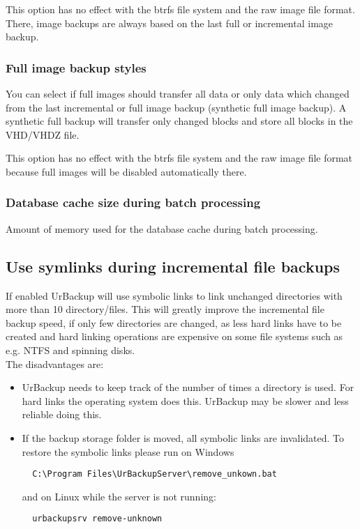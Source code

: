 \documentclass[a4paper,10pt]{article}
\begin{document}
\par\null\par
This option has no effect with the btrfs file system and the raw image file format. There, image backups are always based on the last full or incremental image backup.

\subsubsection{Full image backup styles}

You can select if full images should transfer all data or only data which changed from the last incremental or full image backup (synthetic full image backup). A synthetic full backup will transfer only changed blocks and store all blocks in the VHD/VHDZ file.

\par\null\par
This option has no effect with the btrfs file system and the raw image file format because full images will be disabled automatically there.

\subsubsection{Database cache size during batch processing}

Amount of memory used for the database cache during batch processing.

\subsection{Use symlinks during incremental file backups}

If enabled UrBackup will use symbolic links to link unchanged directories with more than 10 directory/files. This will greatly improve the incremental file backup speed, if only few directories are changed, as less hard links have to be created and hard linking operations are expensive on some file systems such as e.g. NTFS and spinning disks.\\

The disadvantages are:

\begin{itemize}
  \item UrBackup needs to keep track of the number of times a directory is used. For hard links the operating system does this. UrBackup may be slower and less reliable doing this.
  \item If the backup storage folder is moved, all symbolic links are invalidated. To restore the symbolic links please run on Windows
  \begin{verbatim}
  C:\Program Files\UrBackupServer\remove_unkown.bat
  \end{verbatim}
  and on Linux while the server is not running:
  \begin{verbatim}
  urbackupsrv remove-unknown
  \end{verbatim}
  
\end{itemize}
\end{document}
